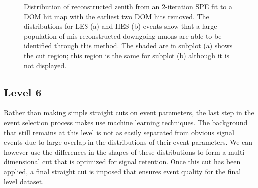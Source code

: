 \documentclass{gatech-thesis}
\begin{document}
\begin{figure}
\centering
{}
\caption{Distribution of reconstructed zenith from an 2-iteration SPE fit to a DOM hit map with the earliest two DOM hits removed. The distributions for LES (a) and HES (b) events show that a large population of mis-reconstructed downgoing muons are able to be identified through this method. The shaded are in subplot (a) shows the cut region; this region is the same for subplot (b) although it is not displayed.}
\label{fig:NoEarlySPE2}
\end{figure}
\subsection{Level 6}
Rather than making simple straight cuts on event parameters, the last step in the event selection process makes use machine learning techniques. The background that still remains at this level is not as easily separated from obvious signal events due to large overlap in the distributions of their event parameters. We can however use the differences in the shapes of these distributions to form a multi-dimensional cut that is optimized for signal retention. Once this cut has been applied, a final straight cut is imposed that ensures event quality for the final level dataset.
\end{document}
